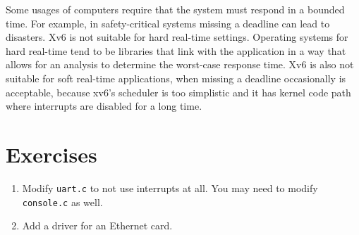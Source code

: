Some usages of computers require that the system must respond in a
bounded time.  For example, in safety-critical systems missing a
deadline can lead to disasters.  Xv6 is not suitable for hard
real-time settings. Operating systems for hard real-time tend to be
libraries that link with the application in a way that allows for an
analysis to determine the worst-case response time.  Xv6 is also not
suitable for soft real-time applications, when missing a deadline
occasionally is acceptable, because xv6's scheduler is too simplistic and it has
kernel code path where interrupts are disabled for a long time.

\section{Exercises}

\begin{enumerate}

\item Modify {\tt uart.c} to not use interrupts at all. You may need
to modify {\tt console.c} as well.

\item Add a driver for an Ethernet card.

\end{enumerate}
